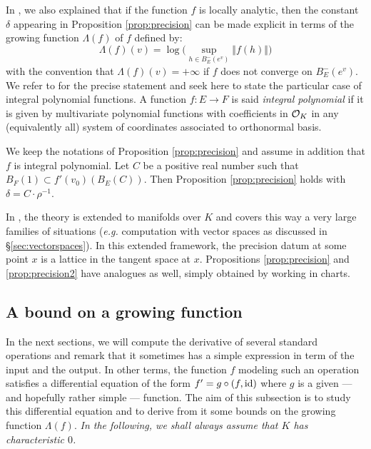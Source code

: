 \documentclass{sig-alternate}
\begin{document}
In \cite{caruso-roe-vaccon:14a}, we also explained that if the function 
$f$ is locally analytic, then the constant $\delta$ appearing in
Proposition \ref{prop:precision} can be made explicit in terms of the
growing function $\Lambda(f)$ of $f$ defined by:
$$\textstyle \Lambda(f)(v) = 
\log \big( \sup_{h \in B^-_E(e^v)} \Vert 
f(h) \Vert \big)$$
with the convention that $\Lambda(f)(v) = +\infty$ if $f$ does not
converge on $B^-_E(e^v)$.
We refer to \cite[Proposition 3.12]{caruso-roe-vaccon:14a} for the
precise statement and seek here to state the particular case of
integral polynomial functions. A function $f : E \to F$ is said 
\emph{integral polynomial} if it is given by multivariate polynomial 
functions with coefficients in $\mathcal O_K$ in any (equivalently all) system 
of coordinates associated to orthonormal basis.

\begin{prop}
\label{prop:precision2}
We keep the notations of Proposition \ref{prop:precision} and assume 
in addition that $f$ is integral polynomial. Let $C$ be a positive real
number such that $B_F(1) \subset f'(v_0)(B_E(C))$. 
Then Proposition \ref{prop:precision} holds with $\delta = C \cdot
\rho^{-1}$.
\end{prop}

In \cite[Appendix A]{caruso-roe-vaccon:14a}, the theory is extended 
to manifolds over $K$ and covers this way a very large families of
situations (\emph{e.g.} computation with vector spaces as discussed
in \S \ref{sec:vectorspaces}). In this extended framework, the precision 
datum at some point $x$ is a lattice in the tangent space at $x$. 
Propositions \ref{prop:precision} and \ref{prop:precision2} have
analogues as well, simply obtained by working in charts.

\subsection{A bound on a growing function}
\label{ssec:boundLambdaf}

In the next sections, we will compute the derivative of several standard 
operations and remark that it sometimes has a simple expression in term 
of the input and the output. In other terms, the function $f$ modeling
such an operation satisfies a differential equation of the form
$f' = g \circ (f, \textrm{id})$
where $g$ is a given --- and hopefully rather simple --- function. The 
aim of this subsection is to study this differential equation and to 
derive from it some bounds on the growing function $\Lambda(f)$. 
\emph{In the following, we shall always assume that $K$ has 
characteristic $0$.}
\end{document}
